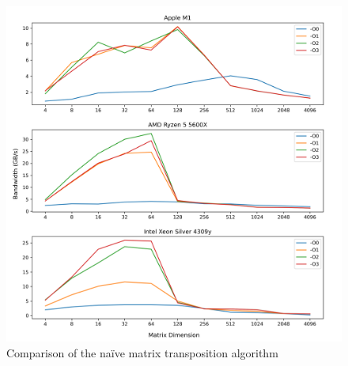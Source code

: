 \documentclass{article}
\begin{document}
\begin{figure}[H]
    \centering
    \includegraphics[scale=0.7]{report/img/naive_comparison_2.png}
    \caption{Comparison of the na\"{i}ve matrix transposition algorithm}
    \label{fig:naive_comparison}
\end{figure}
\end{document}
